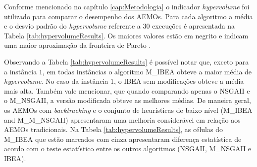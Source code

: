 Conforme mencionado no capítulo \ref{cap:Metodologia} o indicador \textit{hypervolume} foi utilizado para comparar o desempenho dos AEMOs. Para cada algoritmo a média e o desvio padrão do \textit{hypervolume}  referente a 30 execuções é apresentada na Tabela \ref{tab:hypervolumeResults}. Os maiores valores estão em negrito e indicam uma maior aproximação da fronteira de Pareto \cite{barr1998economics}.

Observando a Tabela \ref{tab:hypervolumeResults} é possível notar que, exceto para a instância $1$, em todas instâncias o algoritmo M\_IBEA  obteve a maior média de \textit{hypervolume}. No caso da instância $1$, o IBEA sem modificações obteve a média mais alta. Também vale mencionar, que quando comparando apenas o NSGAII e o M\_NSGAII, a versão modificada obteve as melhores médias. De maneira geral, os AEMOs com \textit{backtracking} e o conjunto de heurísticas de baixo nível (M\_IBEA and M\_M_NSGAII) apresentaram uma melhoria considerável em relação aos AEMOs tradicionais. Na Tabela \ref{tab:hypervolumeResults}, as células do M\_IBEA que estão marcados com cinza apresentaram diferença estatística de acordo com o teste estatístico \cite{mckight2010kruskal} entre os outros algoritmos (NSGAII, M\_NSGAII e IBEA).





